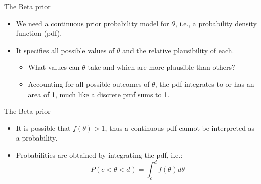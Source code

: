 \documentclass[
  13pt,
  ignorenonframetext,
]{beamer}
\providecommand{\tightlist}{%
  \setlength{\itemsep}{0pt}\setlength{\parskip}{0pt}}
\begin{document}
\begin{frame}{The Beta prior}
\protect\hypertarget{the-beta-prior}{}
\begin{itemize}
\tightlist
\item
  We need a continuous prior probability model for \(\theta\), i.e., a
  probability density function (pdf).
\item
  It specifies all possible values of \(\theta\) and the relative
  plausibility of each.

  \begin{itemize}
  \tightlist
  \item
    What values can \(\theta\) take and which are more plausible than
    others?
  \item
    Accounting for all possible outcomes of \(\theta\), the pdf
    integrates to or has an area of 1, much like a discrete pmf sums to
    1.
  \end{itemize}
\end{itemize}
\end{frame}

\begin{frame}{The Beta prior}
\protect\hypertarget{the-beta-prior-1}{}
\begin{itemize}
\tightlist
\item
  It is possible that \(f(\theta)>1\), thus a continuous pdf cannot be
  interpreted as a probability.
\item
  Probabilities are obtained by integrating the pdf, i.e.: \[
  P(c<\theta<d)=\int_c^d f(\theta) d\theta 
  \]
\end{itemize}
\end{frame}
\end{document}
